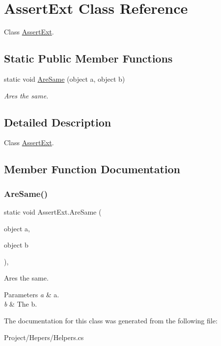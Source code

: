 \hypertarget{class_assert_ext}{}\section{Assert\+Ext Class Reference}
\label{class_assert_ext}


Class \hyperlink{class_assert_ext}{Assert\+Ext}.  


\subsection*{Static Public Member Functions}
\begin{DoxyCompactItemize}
\item 
static void \hyperlink{class_assert_ext_a833f6605bb0e79175aa0485f3b82ccee}{Are\+Same} (object a, object b)
\begin{DoxyCompactList}\small\item\em Ares the same. \end{DoxyCompactList}\end{DoxyCompactItemize}


\subsection{Detailed Description}
Class \hyperlink{class_assert_ext}{Assert\+Ext}. 



\subsection{Member Function Documentation}
\mbox{\label{class_assert_ext_a833f6605bb0e79175aa0485f3b82ccee}} 
\subsubsection{\texorpdfstring{Are\+Same()}{AreSame()}}
{\footnotesize\ttfamily static void Assert\+Ext.\+Are\+Same (\begin{DoxyParamCaption}\item[{object}]{a,  }\item[{object}]{b }\end{DoxyParamCaption})\hspace{0.3cm}{\ttfamily [inline]}, {\ttfamily [static]}}



Ares the same. 


\begin{DoxyParams}{Parameters}
{\em a} & a.\\
\hline
{\em b} & The b.\\
\hline
\end{DoxyParams}


The documentation for this class was generated from the following file\+:\begin{DoxyCompactItemize}
\item 
Project/\+Hepers/Helpers.\+cs\end{DoxyCompactItemize}
